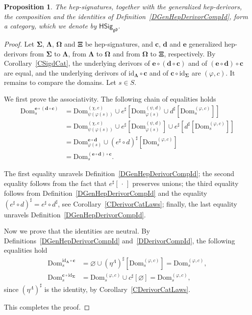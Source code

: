 \documentclass[a4paper, reqno]{amsbook}
\newcommand{\sig}[1]{\mathbf{#1}}             %
\newcommand{\Dom}{\mathrm{Dom}}
\newcommand{\gd}{\mathfrak{gd}}              %
\newcommand{\id}{\mathrm{id}}
\theoremstyle{plain}
\newtheorem{proposition}[theorem]{Proposition}
\theoremstyle{definition}
\begin{document}
\begin{proposition}\label{PHepSigCat}
The hep-signatures, together with the generalized hep-derivors, the composition and the identities of Definition~\ref{DGenHepDerivorCompId}, form a category, which we denote by $\mathsf{HSig}_{\gd}$.
\end{proposition}
\begin{proof}
Let $\sig{\Sigma}$, $\sig{\Lambda}$, $\sig{\Omega}$ and $\sig{\Xi}$ be hep-signatures, and $\mathbf{c}$, $\mathbf{d}$ and $\mathbf{e}$ generalized hep-derivors from $\sig{\Sigma}$ to $\sig{\Lambda}$, from $\sig{\Lambda}$ to $\sig{\Omega}$ and from $\sig{\Omega}$ to $\sig{\Xi}$, respectively.
By Corollary~\ref{CSigdCat}, the underlying derivors of $\mathbf{e}\circ(\mathbf{d}\circ\mathbf{c})$ and of $(\mathbf{e}\circ\mathbf{d})\circ\mathbf{c}$ are equal, and the underlying derivors of $\id_{\sig{\Lambda}}\circ\mathbf{c}$ and of $\mathbf{c}\circ\id_{\sig{\Sigma}}$ are $(\varphi,c)$.
It remains to compare the domains.
Let $s\in S$.

We first prove the associativity.
The following chain of equalities holds
\begin{align*}
\Dom^{\mathbf{e}\circ(\mathbf{d}\circ\mathbf{c})}_{s}
&=
\Dom^{(\chi,e)}_{\psi(\varphi(s))}\cup e^{\sharp}\left[\Dom^{(\psi,d)}_{\varphi(s)}\cup d^{\sharp}\left[\Dom^{(\varphi,c)}_{s}\right]\right]
\tag{1}
\\&=
\Dom^{(\chi,e)}_{\psi(\varphi(s))}\cup e^{\sharp}\left[\Dom^{(\psi,d)}_{\varphi(s)}\right]\cup e^{\sharp}\left[d^{\sharp}\left[\Dom^{(\varphi,c)}_{s}\right]\right]
\tag{2}
\\&=
\Dom^{\mathbf{e}\circ\mathbf{d}}_{\varphi(s)}\cup\left(e^{\sharp}\circ d\right)^{\sharp}\left[\Dom^{(\varphi,c)}_{s}\right]
\tag{3}
\\&=
\Dom^{(\mathbf{e}\circ\mathbf{d})\circ\mathbf{c}}_{s}.
\tag{4}
\end{align*}

The first equality unravels Definition~\ref{DGenHepDerivorCompId}; the second equality follows from the fact that $e^{\sharp}[\,\cdot\,]$ preserves unions; the third equality follows from Definition~\ref{DGenHepDerivorCompId} and the equality $(e^{\sharp}\circ d)^{\sharp}=e^{\sharp}\circ d^{\sharp}$, see Corollary~\ref{CDerivorCatLaws}; finally, the last equality unravels Definition~\ref{DGenHepDerivorCompId}.

Now we prove that the identities are neutral.
By Definitions~\ref{DGenHepDerivorCompId} and~\ref{DDerivorCompId}, the following equalities hold
\begin{align*}
\Dom^{\id_{\sig{\Lambda}}\circ\mathbf{c}}_{s}
&=\varnothing\cup(\eta^{\Lambda})^{\sharp}\left[\Dom^{(\varphi,c)}_{s}\right]=\Dom^{(\varphi,c)}_{s},
\\
\Dom^{\mathbf{c}\circ\id_{\sig{\Sigma}}}_{s}
&=\Dom^{(\varphi,c)}_{s}\cup c^{\sharp}[\varnothing]=\Dom^{(\varphi,c)}_{s},
\end{align*}
since $(\eta^{\Lambda})^{\sharp}$ is the identity, by Corollary~\ref{CDerivorCatLaws}.

This completes the proof.
\end{proof}
\end{document}
